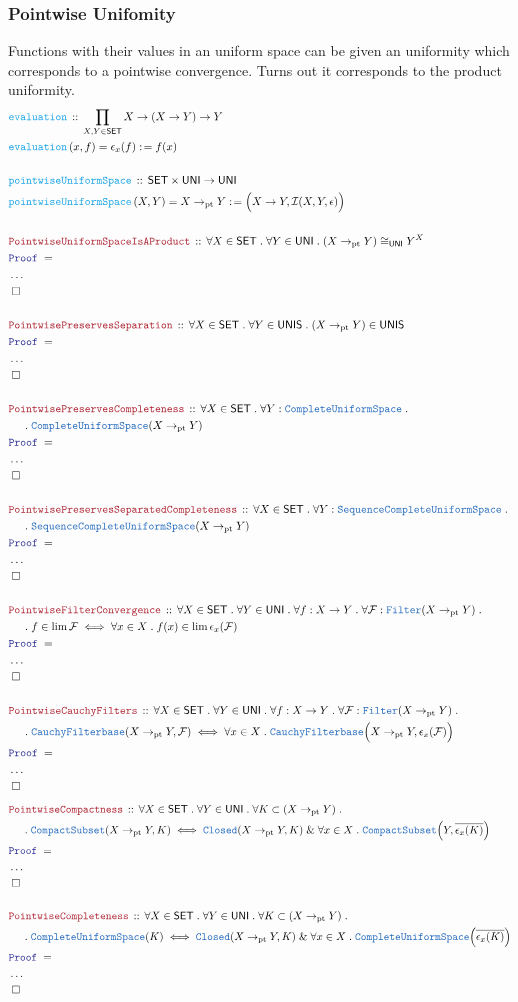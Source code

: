 \documentclass[12pt]{scrartcl}
\newcommand{\TYPE}[1]{\textcolor{NavyBlue}{\mathtt{#1}}}
\newcommand{\FUNC}[1]{\textcolor{Cerulean}{\mathtt{#1}}}
\newcommand{\LOGIC}[1]{\textcolor{Blue}{\mathtt{#1}}}
\newcommand{\THM}[1]{\textcolor{Maroon}{\mathtt{#1}}}
\renewcommand{\.}{\; . \;}
\newcommand{\de}{: \kern 0.1pc =}
\newcommand{\Act}[1]{\left( #1 \right)}
\newcommand{\Theorem}[2]{& \THM{#1} \, :: \, #2 \\ & \Proof = \\ }
\newcommand{\DeclareFunc}[2]{& \FUNC{#1} \, :: \, #2 \\}
\newcommand{\DefineNamedFunc}[4]{&  \FUNC{#1}\Act{#2} = #3 \de #4 \\}
\newcommand{\NewLine}{\\ & \kern 1pc}
\newcommand{\Page}[1]{ \begin{align*} #1 \end{align*}   }
\newcommand{\NoProof}{ & \ldots \\ \EndProof}
\renewcommand{\And}{\; \& \;}
\newcommand{\QED}{\; \square}
\newcommand{\EndProof}{& \QED \\}
\newcommand{\Proof}{\LOGIC{Proof} \; }
\newcommand{\I}{\mathcal{I}}
\newcommand{\SET}{\mathsf{SET}}
\newcommand{\Filter}{\TYPE{Filter}}
\newcommand{\Closed}{\TYPE{Closed}}
\newcommand{\Compacts}{\TYPE{CompactSubset}}
\newcommand{\F}{\mathcal{F}}
\newcommand{\UNI}{\mathsf{UNI}}
\newcommand{\UNIS}{\mathsf{UNIS}}
\newcommand{\CF}{\TYPE{CauchyFilterbase}}
\newcommand{\CUS}{\TYPE{CompleteUniformSpace}}
\newcommand{\SCUS}{\TYPE{SequenceCompleteUniformSpace}}
\newcommand{\pt}{\mathrm{pt}}
\begin{document}
\subsubsection{Pointwise Unifomity}
Functions with their values in an uniform space can be given an uniformity which corresponds to a pointwise convergence. Turns out it corresponds to the product uniformity.
\Page{
	\DeclareFunc{evaluation}
	{
		\prod_{X,Y \in \SET}  X \to (X \to Y) \to Y
	}
	\DefineNamedFunc{evaluation}{x,f}{\epsilon_x(f)}{f(x)}
	\\
	\DeclareFunc{pointwiseUniformSpace}
	{
		\SET \times \UNI \to \UNI
	}
	\DefineNamedFunc{pointwiseUniformSpace}{X,Y}
	{
		X \to_\pt Y
	}
	{
		\Big( 
			X \to Y,
			\I(X,Y, \epsilon )
		\Big)	
	}
	\\
	\Theorem{PointwiseUniformSpaceIsAProduct}
	{
		\forall X \in \SET \.
		\forall Y \in \UNI \.
		(X \to_\pt Y) \cong_\UNI  Y^X 
	}
	\NoProof
	\\
	\Theorem{PointwisePreservesSeparation}
	{
		\forall X \in \SET \.
		\forall Y \in \UNIS \.
		(X \to_\pt Y) \in \UNIS
	}
	\NoProof
	\\
	\Theorem{PointwisePreservesCompleteness}
	{
		\forall X \in \SET \.
		\forall Y : \CUS  \. \NewLine \.
		\CUS(X \to_\pt Y) 
	}
	\NoProof
	\\
	\Theorem{PointwisePreservesSeparatedCompleteness}
	{
		\forall X \in \SET \.
		\forall Y : \SCUS  \. \NewLine \.
		\SCUS(X \to_\pt Y) 
	}
	\NoProof
	\\
	\Theorem{PointwiseFilterConvergence}
	{
		\forall X \in \SET \.
		\forall Y \in \UNI \.
		\forall f : X \to Y \.
		\forall \F : \Filter(X \to_\pt Y) \. \NewLine \.
		f \in \lim \F 
		\iff
		\forall x \in X \. 
		f(x) \in \lim \epsilon_x(\F)
	}
	\NoProof
	\\
	\Theorem{PointwiseCauchyFilters}
	{
		\forall X \in \SET \.
		\forall Y \in \UNI \.
		\forall f : X \to Y \.
		\forall \F : \Filter(X \to_\pt Y) \. \NewLine \.
		\CF(X \to_\pt Y,\F) 
		\iff
		\forall x \in X \. 
		\CF\Big(X \to_\pt Y,\epsilon_x(\F)\Big)
	}
	\NoProof
}
\Page{
	\Theorem{PointwiseCompactness}
	{
		\forall X \in \SET \.
		\forall Y \in \UNI \. 
		\forall K \subset (X \to_\pt Y) \.
		\NewLine \.
		\Compacts(X \to_\pt Y, K)
		\iff
		\Closed(X \to_\pt Y, K)
		\And
		\forall x \in X \.
		\Compacts\Big(Y, \overline{\epsilon_x (K)}\Big)
	}
	\NoProof
	\\
	\Theorem{PointwiseCompleteness}
	{
		\forall X \in \SET \.
		\forall Y \in \UNI \. 
		\forall K \subset (X \to_\pt Y) \.
		\NewLine \.
		\CUS(K)
		\iff
		\Closed(X \to_\pt Y, K)
		\And
		\forall x \in X \.
		\CUS\Big(\overline{\epsilon_x (K)}\Big)
	}
	\NoProof
}
\newpage
\end{document}
